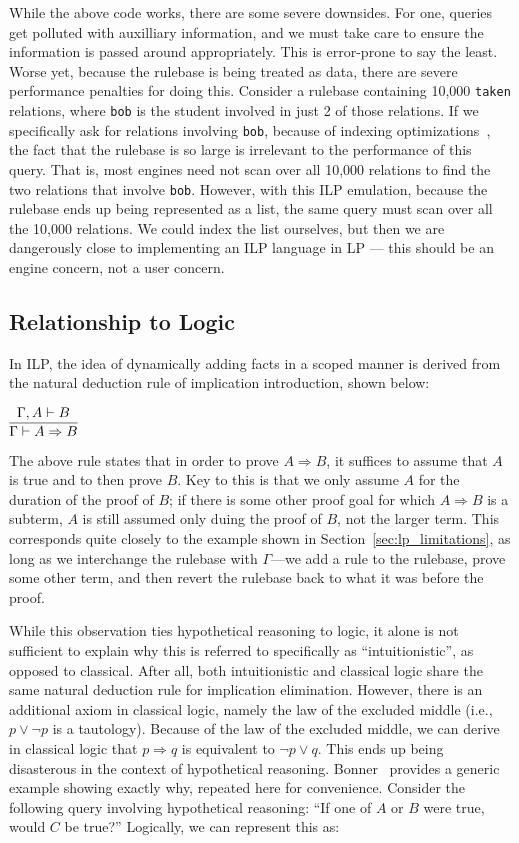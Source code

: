 While the above code works, there are some severe downsides.
For one, queries get polluted with auxilliary information, and we must take care to ensure the information is passed around appropriately.
This is error-prone to say the least.
Worse yet, because the rulebase is being treated as data, there are severe performance penalties for doing this.
Consider a rulebase containing 10,000 \texttt{taken} relations, where \texttt{bob} is the student involved in just 2 of those relations.
If we specifically ask for relations involving \texttt{bob}, because of indexing optimizations~\cite{Ait-Kaci:1991:WAM:113900, AICPub641:1983}, the fact that the rulebase is so large is irrelevant to the performance of this query.
That is, most engines need not scan over all 10,000 relations to find the two relations that involve \texttt{bob}.
However, with this ILP emulation, because the rulebase ends up being represented as a list, the same query must scan over all the 10,000 relations.
We could index the list ourselves, but then we are dangerously close to implementing an ILP language in LP --- this should be an engine concern, not a user concern.


\subsection{Relationship to Logic}
In ILP, the idea of dynamically adding facts in a scoped manner is derived from the natural deduction rule of implication introduction, shown below:

\begin{center}
  $\infer{\Gamma \vdash A \Rightarrow B}{\Gamma, A \vdash B}$
\end{center}

\noindent The above rule states that in order to prove $A \Rightarrow B$, it suffices to assume that $A$ is true and to then prove $B$.
Key to this is that we only assume $A$ for the duration of the proof of $B$; if there is some other proof goal for which $A \Rightarrow B$ is a subterm, $A$ is still assumed only duing the proof of $B$, not the larger term.
This corresponds quite closely to the example shown in Section~\ref{sec:lp_limitations}, as long as we interchange the rulebase with $\Gamma$---we add a rule to the rulebase, prove some other term, and then revert the rulebase back to what it was before the proof.

While this observation ties hypothetical reasoning to logic, it alone is not sufficient to explain why this is referred to specifically as ``intuitionistic'', as opposed to classical.
After all, both intuitionistic and classical logic share the same natural deduction rule for implication elimination.
However, there is an additional axiom in classical logic, namely the law of the excluded middle (i.e., $p \lor \neg p$ is a tautology).
Because of the law of the excluded middle, we can derive in classical logic that $p \Rightarrow q$ is equivalent to $\neg p \lor q$.
This ends up being disasterous in the context of hypothetical reasoning.
Bonner~\cite{Bonner88} provides a generic example showing exactly why, repeated here for convenience.
Consider the following query involving hypothetical reasoning: ``If one of $A$ or $B$ were true, would $C$ be true?''
Logically, we can represent this as:

